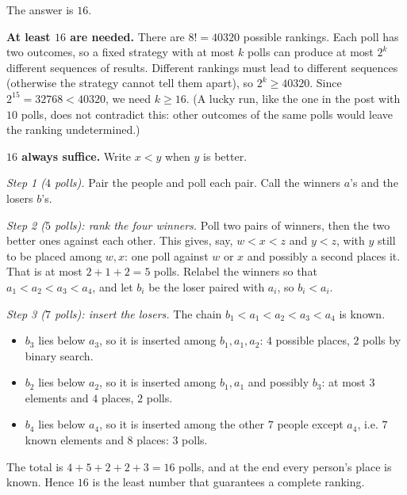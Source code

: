The answer is $\boxed{16}$.

\textbf{At least $16$ are needed.} There are $8!=40320$ possible rankings. Each poll has two outcomes, so a fixed strategy with at most $k$ polls can produce at most $2^k$ different sequences of results. Different rankings must lead to different sequences (otherwise the strategy cannot tell them apart), so $2^k\ge40320$. Since $2^{15}=32768<40320$, we need $k\ge16$. (A lucky run, like the one in the post with $10$ polls, does not contradict this: other outcomes of the same polls would leave the ranking undetermined.)

\textbf{$16$ always suffice.} Write $x<y$ when $y$ is better.

\emph{Step 1 ($4$ polls).} Pair the people and poll each pair. Call the winners $a$'s and the losers $b$'s.

\emph{Step 2 ($5$ polls): rank the four winners.} Poll two pairs of winners, then the two better ones against each other. This gives, say, $w<x<z$ and $y<z$, with $y$ still to be placed among $w,x$: one poll against $w$ or $x$ and possibly a second places it. That is at most $2+1+2=5$ polls. Relabel the winners so that $a_1<a_2<a_3<a_4$, and let $b_i$ be the loser paired with $a_i$, so $b_i<a_i$.

\emph{Step 3 ($7$ polls): insert the losers.} The chain $b_1<a_1<a_2<a_3<a_4$ is known.
\begin{itemize}
\item $b_3$ lies below $a_3$, so it is inserted among $b_1,a_1,a_2$: $4$ possible places, $2$ polls by binary search.
\item $b_2$ lies below $a_2$, so it is inserted among $b_1,a_1$ and possibly $b_3$: at most $3$ elements and $4$ places, $2$ polls.
\item $b_4$ lies below $a_4$, so it is inserted among the other $7$ people except $a_4$, i.e. $7$ known elements and $8$ places: $3$ polls.
\end{itemize}
The total is $4+5+2+2+3=16$ polls, and at the end every person's place is known. Hence $16$ is the least number that guarantees a complete ranking.

